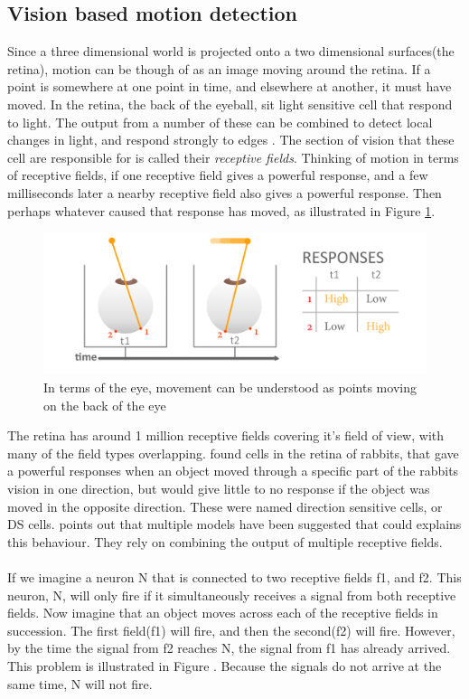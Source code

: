 \documentclass[11pt,a4paper,oneside,table,xcdraw]{article}
\begin{document}
\subsection{Vision based motion detection}
Since a three dimensional world is projected onto a two dimensional surfaces(the retina), motion can be though of as an image moving around the retina. If a point is somewhere at one point in time, and elsewhere at another, it must have moved. In the retina, the back of the eyeball, sit light sensitive cell that respond to light. The output from a number of these can be combined to detect local changes in light, and respond strongly to edges \cite[p. 53]{coursebook}. The section of vision that these cell are responsible for is called their \textit{receptive fields}. Thinking of motion in terms of receptive fields, if one receptive field gives a powerful response, and a few milliseconds later a nearby receptive field also gives a powerful response. Then perhaps whatever caused that response has moved, as illustrated in Figure \ref{fig:overtime}.
\begin{figure}[H]
		\centering
		\includegraphics[width=1\linewidth]{figure/overtime.png}
		\caption{In terms of the eye, movement can be understood as points moving on the back of the eye}
		\label{fig:overtime}
\end{figure}
The retina has around 1 million receptive fields covering it's field of view, with many of the field types overlapping\cite[p. 64-65]{coursebook}. \cite{Barlow1965} found cells in the retina of rabbits, that gave a powerful responses when an object moved through a specific part of the rabbits vision in one direction, but would give little to no response if the object was moved in the opposite direction. These were named direction sensitive cells, or DS cells. \citet{review} points out that multiple models have been suggested that could explains this behaviour. They rely on combining the output of multiple receptive fields.\\\\
If we imagine a neuron N that is connected to two receptive fields f1, and f2. This neuron, N, will only fire if it simultaneously receives a signal from both receptive fields. Now imagine that an object moves across each of the receptive fields in succession. The first field(f1) will fire, and then the second(f2) will fire. However, by the time the signal from f2 reaches N, the signal from f1 has already arrived. This problem is illustrated in Figure . Because the signals do not arrive at the same time, N will not fire.\\\\
\end{document}
